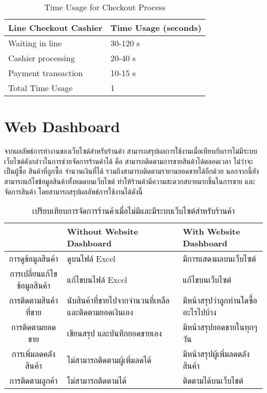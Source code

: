 \begin{table}[htbp]
    \centering
    \caption{Time Usage for Checkout Process}
    \begin{tabular}{|p{5cm}|p{2cm}|}
        \textbf{Line Checkout Cashier} & \textbf{Time Usage (seconds)} \\
        \hline
        Waiting in line                & 30-120 s                      \\
        Cashier processing             & 20-40 s                       \\
        Payment transaction            & 10-15 s                       \\
        \hline
        Total Time Usage               & 1                             \\
        \hline
    \end{tabular}
\end{table}


\section{Web Dashboard}
จากผลลัพธ์การทำงานของเว็บไซต์สำหรับร้านค้า สามารถสรุปผลการใช้งานเมื่อเทียบกับการไม่มีระบบเว็บไซต์ดังกล่าวในการช่วยจัดการร้านค้าได้ คือ สามารถติดตามการขายสินค้าได้ตลอดเวลา ไม่ว่าจะเป็นผู้ซื้อ สินค้าที่ถูกซื้อ จำนวนเงินที่ได้ รวมถึงสามารถติดตามรายานยอดขายได้อีกด้วย นอกจากนี้ยังสามารถแก้ไขข้อมูลสินค้าทั้งหมดบนเว็บไซต์ ทำให้ร้านค้ามีความสะดวกสบายมากขึ้นในการขาย และจัดการสินค้า โดยสามารถสรุปผลลัพธ์การใช้งานได้ดังนี้

\begin{table}[htbp]
    \centering
    \caption{เปรียบเทียบการจัดการร้านค้าเมื่อไม่มีและมีระบบเว็บไซต์สำหรับร้านค้า}
    \begin{tabularx}{\textwidth}{ |c|X|X| }
    \hline
    \textbf{} & \textbf{Without Website Dashboard} & \textbf{With Website Dashboard}\\
    \hline
    การดูข้อมูลสินค้า         & ดูบนไฟล์ Excel & มีการแสดงผลบนเว็บไซต์ \\ 
    \hline
    การเปลี่ยนแก้ไขข้อมูลสินค้า & แก้ไขบนไฟล์ Excel & แก้ไขบนเว็บไซต์ \\ 
    \hline
    การติดตามสินค้าที่ขาย     & นับสินค้าที่ขายไปจากจำนวนที่เหลือ และติดตามยอดเงินเอง & มีหน้าสรุปว่าลูกท่านใดซื้ออะไรไปบ้าง \\ 
    \hline
    การติดตามยอดขาย       & เขียนสรุป และบันทึกยอดขายเอง & มีหน้าสรุปยอดขายในทุกๆวัน \\ 
    \hline
    การเพิ่มลดคลังสินค้า      & ไม่สามารถติดตามผู้เพิ่มลดได้ & มีหน้าสรุปผู้เพิ่มลดตลังสินค้า \\ 
    \hline
    การติดตามลูกค้า         & ไม่สามารถติดตามได้ & ติดตามได้บนเว็บไชต์ \\ 
    \hline
    \end{tabularx}
\end{table}

